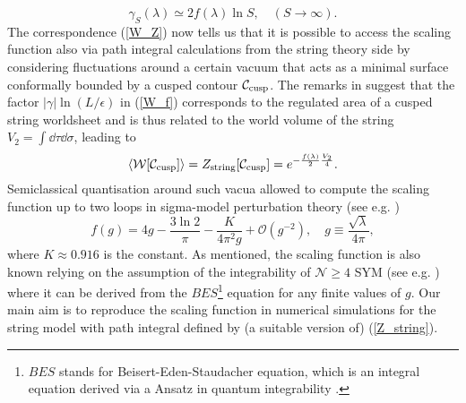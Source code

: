 %
%
\begin{equation}
\gamma_{S}(\lambda) \simeq 2 f(\lambda) \ln S,\quad  (S\to \infty).
\end{equation}
%
%
The correspondence (\ref{W_Z}) now tells us that it is possible to access the scaling function also via path integral calculations from the string theory side by considering fluctuations around a certain vacuum that acts as a minimal surface conformally bounded by a cusped contour $\mathcal{C}_{\rm cusp}$.  The remarks in \cite{Kruczenski:2002fb,Kruczenski:2007cy} suggest that the factor $\vert \gamma\vert \ln (L/\epsilon)$ in (\ref{W_f}) corresponds to the regulated area of a cusped string worldsheet and is thus related to the world volume of the string $V_{2}=\int \dd\tau \dd \sigma$, leading to
%
%
\begin{equation}
\langle \mathcal{W}[\mathcal{C_{\rm cusp}}] \rangle =Z_{\rm string}[\mathcal{C_{\rm cusp}}] = e^{-\frac{f(\lambda)}{2}\frac{V_{2}}{4}}.
\label{eq: W_exp_f}
\end{equation}
Semiclassical quantisation around such vacua allowed to compute the scaling function up to two loops in sigma-model perturbation theory (see e.g. \cite{Giombi:2009gd})
%
%
\begin{equation}
f(g) = 4g - \frac{3\ln 2}{\pi} - \frac{K}{4\pi^{2}g} + \mathcal{O}(g^{-2}), \quad g\equiv \frac{\sqrt{\lambda}}{4\pi},
\label{eq: scaling_fct}
\end{equation}
%
%
where $K\approx 0.916$ is the  constant. As mentioned, the scaling function is also known relying on the assumption of the integrability of $\mathcal{N}\geq 4$ SYM (see e.g. \cite{Beisert:2010jr}) where it can be derived from the $BES$\footnote{$BES$ stands for Beisert-Eden-Staudacher equation, which is an integral equation derived via a  Ansatz in quantum integrability \cite{Beisert:2006ez}.} equation for any finite values of $g$. Our main aim is to reproduce the scaling function in numerical simulations for the string model with path integral defined by (a suitable version of) (\ref{Z_string}).
%
%
%
%
%
%
%
%
%
